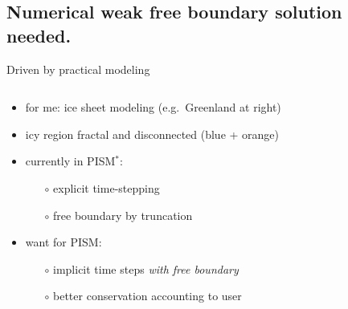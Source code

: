 \documentclass{beamer}
\begin{document}
\subsection{Numerical weak free boundary solution needed.}

\begin{frame}{Driven by practical modeling}

\begin{columns}
\begin{column}{0.5\textwidth}
\begin{itemize}
\small
\item for me: ice sheet modeling (e.g.~Greenland at right)
\item icy region fractal and disconnected (blue + orange)
\item currently in PISM$^*$:
  \begin{itemize}
  \item[$\circ$] explicit time-stepping
  \item[$\circ$] free boundary by truncation
  \end{itemize}
\item want for PISM:
  \begin{itemize}
  \item[$\circ$] implicit time steps \emph{with free boundary}
  \item[$\circ$] better conservation accounting to user
  \end{itemize}
\end{itemize}


\end{column}
\end{columns}
\end{frame}
\end{document}

